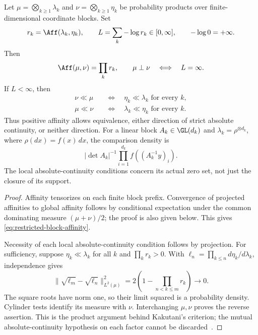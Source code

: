 \begin{theorem}
\label{thm:block-kakutani}
Let \(\mu=\bigotimes_{k\geq1}\lambda_k\) and
\(\nu=\bigotimes_{k\geq1}\eta_k\) be probability products over
finite-dimensional coordinate blocks.
Set
\[
 r_k=\Aff(\lambda_k,\eta_k),\qquad
 L=\sum_k-\log r_k\in[0,\infty],
 \qquad -\log0=+\infty.
\]
Then
\begin{equation}
 \Aff(\mu,\nu)=\prod_kr_k,\qquad
 \mu\perp\nu\quad\Longleftrightarrow\quad L=\infty.
 \label{eq:restricted-block-affinity}
\end{equation}
If \(L<\infty\), then
\begin{equation}
 \begin{aligned}
  \nu\ll\mu&\quad\Longleftrightarrow\quad
                         \eta_k\ll\lambda_k\text{ for every }k,\\
  \mu\ll\nu&\quad\Longleftrightarrow\quad
                         \lambda_k\ll\eta_k\text{ for every }k.
 \end{aligned}
 \label{eq:restricted-block-ac}
\end{equation}
Thus positive affinity allows equivalence, either direction of strict
absolute continuity, or neither direction.
For a linear block \(A_k\in\GL(d_k)\) and
\(\lambda_k=\rho^{\otimes d_k}\), where \(\rho(dx)=f(x)\,dx\),
the comparison density is
\[
 |\det A_k|^{-1}\prod_{i=1}^{d_k}
                         f((A_k^{-1}y)_i).
\]
The local absolute-continuity conditions concern its actual zero
set, not just the closure of its support.
\end{theorem}
\begin{proof}
Affinity tensorizes on each finite block prefix.
Convergence of projected affinities to global affinity follows by
conditional expectation under the common dominating measure
\((\mu+\nu)/2\); the proof is also given below.
This gives \eqref{eq:restricted-block-affinity}.

Necessity of each local absolute-continuity condition follows by
projection.
For sufficiency, suppose \(\eta_k\ll\lambda_k\) for all \(k\) and
\(\prod_kr_k>0\).
With \(\ell_n=\prod_{k\leq n}d\eta_k/d\lambda_k\), independence gives
\[
 \|\sqrt{\ell_m}-\sqrt{\ell_n}\|_{L^2(\mu)}^2
       =2\left(1-\prod_{n<k\leq m}r_k\right)\longrightarrow0.
\]
The square roots have norm one, so their limit squared is a
probability density.
Cylinder tests identify its measure with \(\nu\).
Interchanging \(\mu,\nu\) proves the reverse assertion.
This is the product argument behind Kakutani's criterion; the
mutual absolute-continuity hypothesis on each factor cannot be
discarded~\cite{kakutani1948equivalence,shepp1965translate}.
\end{proof}

